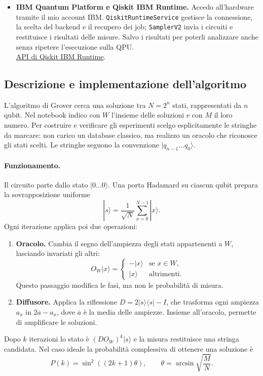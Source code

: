﻿\documentclass[a4paper,12pt]{article}
\begin{document}
\begin{itemize}
    \item \textbf{IBM Quantum Platform e Qiskit IBM Runtime.}
    Accedo all'hardware tramite il mio account IBM.
    \texttt{QiskitRuntimeService} gestisce la connessione, la scelta del
    backend e il recupero dei job; \texttt{SamplerV2} invia i circuiti
    e restituisce i risultati delle misure. Salvo i risultati per poterli
    analizzare anche senza ripetere l'esecuzione sulla QPU.\\
    \href{https://quantum.cloud.ibm.com/docs/en/api/qiskit-ibm-runtime}{API di Qiskit IBM Runtime}.
\end{itemize}
\subsection{Descrizione e implementazione dell'algoritmo}
L'algoritmo di Grover cerca una soluzione tra $N=2^n$ stati, rappresentati
da $n$ qubit. Nel notebook indico con $W$ l'insieme delle soluzioni e con
$M$ il loro numero. Per costruire e verificare gli esperimenti scelgo
esplicitamente le stringhe da marcare: non carico un database classico,
ma realizzo un oracolo che riconosce gli stati scelti.
Le stringhe seguono la convenzione $|q_{n-1}\ldots q_0\rangle$.

\paragraph{Funzionamento.}
Il circuito parte dallo stato $|0\ldots0\rangle$. Una porta Hadamard
su ciascun qubit prepara la sovrapposizione uniforme
\[
    |s\rangle=\frac{1}{\sqrt{N}}\sum_{x=0}^{N-1}|x\rangle.
\]
Ogni iterazione applica poi due operazioni:
\begin{enumerate}
    \item \textbf{Oracolo.} Cambia il segno dell'ampiezza degli stati
    appartenenti a $W$, lasciando invariati gli altri:
    \[
        O_W|x\rangle=
        \begin{cases}
            -|x\rangle & \text{se }x\in W,\\
            |x\rangle & \text{altrimenti}.
        \end{cases}
    \]
    Questo passaggio modifica le fasi, ma non le probabilità di misura.
    \item \textbf{Diffusore.} Applica la riflessione
    $D=2|s\rangle\langle s|-I$, che trasforma ogni ampiezza $a_x$
    in $2\overline{a}-a_x$, dove $\overline{a}$ è la media delle ampiezze.
    Insieme all'oracolo, permette di amplificare le soluzioni.
\end{enumerate}
Dopo $k$ iterazioni lo stato è $(DO_W)^k|s\rangle$ e la misura
restituisce una stringa candidata. Nel caso ideale la probabilità
complessiva di ottenere una soluzione è
\[
    P(k)=\sin^2((2k+1)\theta),\qquad
    \theta=\arcsin\sqrt{\frac{M}{N}}.
\]
\newpage
\end{document}
